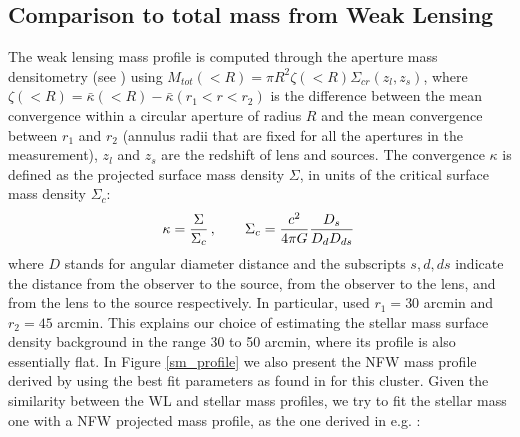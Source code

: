 { \subsection{Comparison to total mass from Weak Lensing}
 
The weak lensing mass profile is computed through the aperture mass densitometry (see \citealt{clowe}) using $M_{tot}(<R)=\pi R^2\zeta(<R)\Sigma_{cr}(z_l,z_s)$, where $\zeta(<R)=\bar{\kappa}(<R)-\bar{\kappa}(r_1<r<r_{2})$ is the difference between the mean convergence within a circular aperture of radius $R$ and the mean convergence between $r_1$ and $r_2$ (annulus radii that are fixed for all the apertures in the measurement), $z_l$ and $z_s$ are the redshift of lens and sources.  The convergence $\kappa$ is defined as the projected surface mass density  $\Sigma$, in units of the critical surface mass density $\Sigma_c$:
\begin{equation}\centering
\kappa=\frac{\Sigma}{\Sigma_c}\, , \qquad \Sigma_c=\frac{c^2}{4\pi G}\frac{D_s}{D_d D_{ds}}\,
\end{equation}
where $D$ stands for angular diameter distance and the subscripts $s, d, ds$ indicate the distance from the observer to the source, from the observer to the lens, and from the lens to the source respectively. In particular, \citet{melchior} used $r_1=30$ arcmin and $r_{2}=45$ arcmin. This explains our choice of estimating the stellar mass surface density background in the range 30 to 50 arcmin, where its profile is also essentially flat.
In Figure \ref{sm_profile} we also present the NFW mass profile derived by using the best fit parameters as found in \citet{melchior} for this cluster.
Given the similarity between the WL and  stellar mass profiles, we try to fit the stellar mass one with a NFW projected mass profile, as  the one derived in e.g. \citet{nfwfit}:

}
